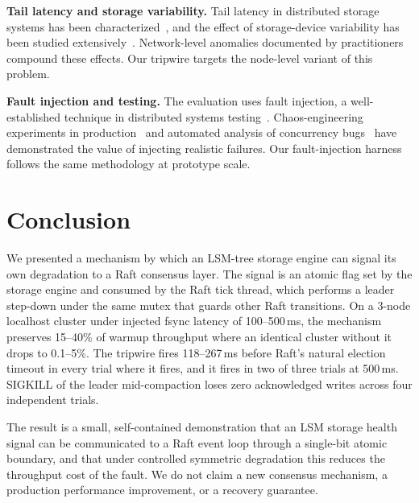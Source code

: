 \documentclass[conference, a4paper]{IEEEtran}
\begin{document}
\textbf{Tail latency and storage variability.} Tail latency in
distributed storage systems has been
characterized~\cite{dean_tail,li_tales_tail,hao_tail}, and the effect of
storage-device variability has been studied
extensively~\cite{narayanan_ssd}. Network-level anomalies documented by
practitioners~\cite{bailis_network} compound these effects. Our tripwire
targets the node-level variant of this problem.

\textbf{Fault injection and testing.} The evaluation uses fault
injection, a well-established technique in distributed systems
testing~\cite{yuan_simple,alvaro_lineage}. Chaos-engineering experiments
in production~\cite{alvaro_lineage} and automated analysis
of concurrency bugs~\cite{leesatapornwongsa_taxdc} have demonstrated the
value of injecting realistic failures. Our fault-injection harness
follows the same methodology at prototype scale.

\section{Conclusion}

We presented a mechanism by which an LSM-tree storage engine can signal
its own degradation to a Raft consensus layer. The signal is an atomic
flag set by the storage engine and consumed by the Raft tick thread,
which performs a leader step-down under the same mutex that guards other
Raft transitions. On a 3-node localhost cluster under injected fsync
latency of 100--500\,ms, the mechanism preserves 15--40\% of warmup
throughput where an identical cluster without it drops to 0.1--5\%. The
tripwire fires 118--267\,ms before Raft's natural election timeout in
every trial where it fires, and it fires in two of three trials at
500\,ms. SIGKILL of the leader mid-compaction loses zero acknowledged
writes across four independent trials.

The result is a small, self-contained demonstration that an LSM storage
health signal can be communicated to a Raft event loop through a
single-bit atomic boundary, and that under controlled symmetric
degradation this reduces the throughput cost of the fault. We do not
claim a new consensus mechanism, a production performance improvement,
or a recovery guarantee.
\end{document}
